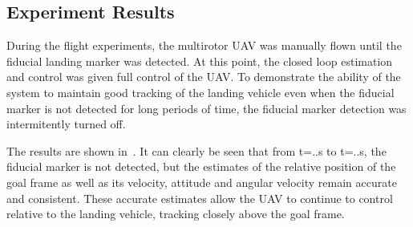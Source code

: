 
\subsection{Experiment Results}
During the flight experiments, the multirotor UAV was manually flown until the
fiducial landing marker was detected. At this point, the closed loop estimation
and control was given full control of the UAV. To demonstrate the ability of the
system to maintain good tracking of the landing vehicle even when the fiducial
marker is not detected for long periods of time, the fiducial marker detection
was intermitently turned off.

The results are shown in~. It can clearly be seen that from
t=..s to t=..s, the fiducial marker is not detected, but the estimates of the
relative position of the goal frame as well as its velocity, attitude and
angular velocity remain accurate and consistent. These accurate estimates allow
the UAV to continue to control relative to the landing vehicle, tracking closely
above the goal frame. 
